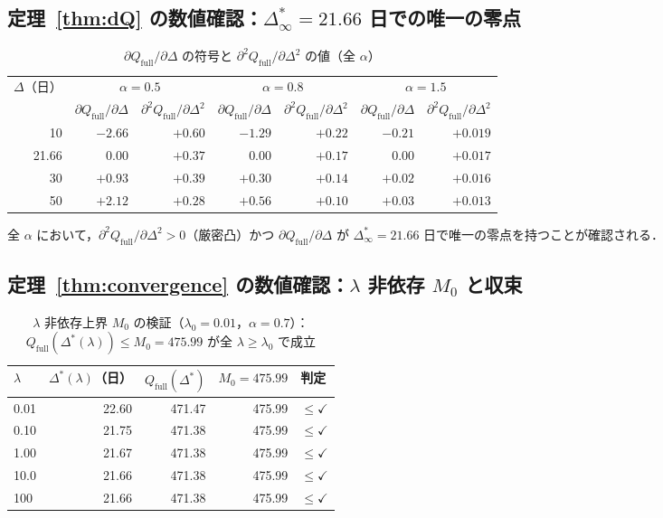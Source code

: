 \documentclass[12pt,a4paper]{article}
\theoremstyle{plain}
\theoremstyle{definition}
\theoremstyle{remark}
\newcommand{\Qf}{Q_{\mathrm{full}}}
\newcommand{\Dopt}{\Delta^{*}}
\newcommand{\Dinf}{\Delta^{*}_{\infty}}
\begin{document}
\subsection{定理~\ref{thm:dQ} の数値確認：$\Dinf=21.66$ 日での唯一の零点}

\begin{table}[h]
\centering
\caption{$\partial\Qf/\partial\Delta$ の符号と $\partial^2\Qf/\partial\Delta^2$ の値（全 $\alpha$）}
\label{tab:dQ}
\begin{tabular}{@{}rrrrrrr@{}}
\toprule
\multirow{2}{*}{$\Delta$（日）} &
\multicolumn{2}{c}{$\alpha=0.5$} &
\multicolumn{2}{c}{$\alpha=0.8$} &
\multicolumn{2}{c}{$\alpha=1.5$} \\
\cmidrule{2-3}\cmidrule{4-5}\cmidrule{6-7}
& $\partial\Qf/\partial\Delta$ & $\partial^2\Qf/\partial\Delta^2$ &
$\partial\Qf/\partial\Delta$ & $\partial^2\Qf/\partial\Delta^2$ &
$\partial\Qf/\partial\Delta$ & $\partial^2\Qf/\partial\Delta^2$ \\
\midrule
10    & $-2.66$ & $+0.60$ & $-1.29$ & $+0.22$ & $-0.21$ & $+0.019$ \\
21.66 & $0.00$  & $+0.37$ & $0.00$  & $+0.17$ & $0.00$  & $+0.017$ \\
30    & $+0.93$ & $+0.39$ & $+0.30$ & $+0.14$ & $+0.02$ & $+0.016$ \\
50    & $+2.12$ & $+0.28$ & $+0.56$ & $+0.10$ & $+0.03$ & $+0.013$ \\
\bottomrule
\end{tabular}
\end{table}

全 $\alpha$ において，$\partial^2\Qf/\partial\Delta^2>0$（厳密凸）かつ $\partial\Qf/\partial\Delta$ が
$\Dinf=21.66$ 日で唯一の零点を持つことが確認される．

\subsection{定理~\ref{thm:convergence} の数値確認：$\lambda$ 非依存 $M_0$ と収束}

\begin{table}[h]
\centering
\caption{$\lambda$ 非依存上界 $M_0$ の検証（$\lambda_0=0.01$，$\alpha=0.7$）：
$\Qf(\Dopt(\lambda))\le M_0=475.99$ が全 $\lambda\ge\lambda_0$ で成立}
\label{tab:compact}
\begin{tabular}{@{}lrrrl@{}}
\toprule
$\lambda$ & $\Dopt(\lambda)$（日）& $\Qf(\Dopt)$ & $M_0=475.99$ & 判定 \\
\midrule
0.01 & 22.60 & 471.47 & 475.99 & $\le\checkmark$ \\
0.10 & 21.75 & 471.38 & 475.99 & $\le\checkmark$ \\
1.00 & 21.67 & 471.38 & 475.99 & $\le\checkmark$ \\
10.0 & 21.66 & 471.38 & 475.99 & $\le\checkmark$ \\
100  & 21.66 & 471.38 & 475.99 & $\le\checkmark$ \\
\bottomrule
\end{tabular}
\end{table}
\end{document}
